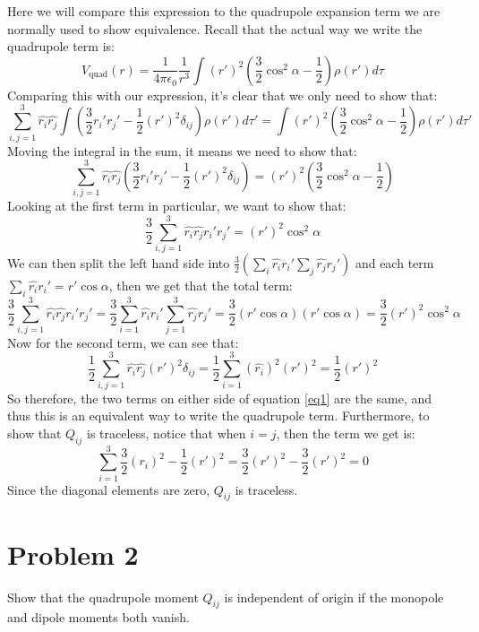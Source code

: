 \documentclass[10pt]{article}
\begin{document}
	\begin{solution}
		Here we will compare this expression to the quadrupole expansion term we are normally used to show 
		equivalence. Recall that the actual way we write the quadrupole term is:
		\[
			V_{\text{quad}}(r) = \frac{1}{4\pi \epsilon_0}\frac{1}{r^3}\int (r')^2\left( \frac{3}{2}\cos^2 \alpha
			- \frac{1}{2}\right) \rho(r') d\tau
		\] 
		Comparing this with our expression, it's clear that we only need to show that:
		\[
			\sum_{i, j = 1}^3 \hat{r_i}\hat{r_j}\int \left(\frac{3}{2}r_i' r_j' -
			\frac{1}{2}(r')^2 \delta_{ij}\right)\rho(r') d\tau' = \int (r')^2\left( \frac{3}{2}\cos^2 \alpha - 
			\frac{1}{2}\right) \rho(r') d\tau'
		\] 
		Moving the integral in the sum, it means we need to show that:
		\begin{equation}
		\label{eq1}
			\sum_{i, j = 1}^3 \hat{r_i}\hat{ r_j}\left( \frac{3}{2}r_i' r_j' - 
			\frac{1}{2}(r')^2 \delta_{ij}\right)
			= (r')^2 \left( \frac{3}{2}\cos^2 \alpha - \frac{1}{2} \right)
		\end{equation} 
		Looking at the first term in particular, we want to show that:
		\[
			\frac{3}{2}\sum_{i, j = 1}^3 \hat{r_i}\hat{r_j}r_i'r_j' = (r')^2 \cos^2 \alpha
		\] 
		We can then split the left hand side into $\frac{3}{2}(\sum_i \hat{r_i}r_i' \sum_j \hat{r_j}r_j')$ and
		each term $\sum_i \hat{r_i}r_i' = r'\cos \alpha$, then we get that the total term:
		\[
			\frac{3}{2}\sum_{i, j = 1}^3 \hat{r_i}\hat{r_j}r_i'r_j' = \frac{3}{2}\sum_{i = 1}^3 \hat{r_i}r_i'
			\sum_{j = 1}^3 \hat{r_j}r_j' =  \frac{3}{2}(r'\cos \alpha)(r' \cos \alpha) = \frac{3}{2}(r')^2 
			\cos^2 \alpha
		\] 
		Now for the second term, we can see that: 
		\[
			\frac{1}{2}\sum_{i, j = 1}^3 \hat{r_i}\hat{r_j}(r')^2 \delta_{ij} = \frac{1}{2}\sum_{i = 1}^3
			(\hat{r_i})^2 (r')^2 = \frac{1}{2}(r')^2
		\] 
		So therefore, the two terms on either side of equation \ref{eq1} are the same, and thus this is an 
		equivalent way to write the quadrupole term. Furthermore, to show that $Q_{ij}$ is traceless, notice 
		that when $i = j$, then the term we get is:
		\[
			\sum_{i = 1}^3 \frac{3}{2}(r_i)^2 - \frac{1}{2}(r')^2 = \frac{3}{2}(r')^2 - \frac{3}{2}(r')^2 = 0
		\] 
		Since the diagonal elements are zero, $Q_{ij}$ is traceless. 
	\end{solution}
	\pagebreak
	\section*{Problem 2}
	Show that the quadrupole moment $Q_{ij}$ is independent of origin if the monopole and dipole moments both 
	vanish.
\end{document}
